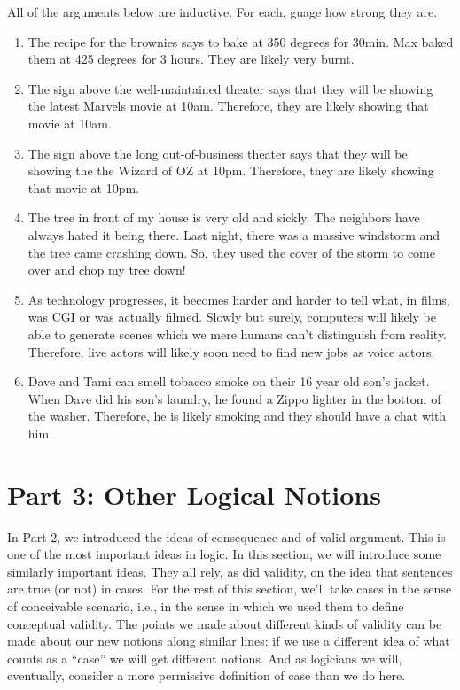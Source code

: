 \problempart
\label{pr.strength}
All of the arguments below are inductive. For each, guage how strong they are.
\begin{enumerate}
\item The recipe for the brownies says to bake at 350 degrees for 30min. Max baked them at 425 degrees for 3 hours. They are likely very burnt.
\item The sign above the well-maintained theater says that they will be showing the latest Marvels movie at 10am. Therefore, they are likely showing that movie at 10am.
\item The sign above the long out-of-business theater says that they will be showing the the Wizard of OZ at 10pm. Therefore, they are likely showing that movie at 10pm. 
\item The tree in front of my house is very old and sickly. The neighbors have always hated it being there. Last night, there was a massive windstorm and the tree came crashing down. So, they used the cover of the storm to come over and chop my tree down!
\item As technology progresses, it becomes harder and harder to tell what, in films, was CGI or was actually filmed. Slowly but surely, computers will likely be able to generate scenes which we mere humans can't distinguish from reality. Therefore, live actors will likely soon need to find new jobs as voice actors.  
\item Dave and Tami can smell tobacco smoke on their 16 year old son's jacket. When Dave did his son's laundry, he found a Zippo lighter in the bottom of the washer. Therefore, he is likely smoking and they should have a chat with him.  
\end{enumerate}

\chapter{Part 3: Other Logical Notions}
In Part 2, we introduced the ideas of consequence and of valid argument. This is one of the most important ideas in logic. In this section, we will introduce some similarly important ideas. They all rely, as did validity, on the idea that sentences are true (or not) in cases. For the rest of this section, we’ll take cases in the sense of conceivable scenario, i.e., in the sense in which we used them to define conceptual validity. The points we made about different kinds of validity can be made about our new notions along similar lines: if we use a different idea of what counts as a “case” we will get different notions. And as logicians we will, eventually, consider a more permissive definition of case than we do here.
